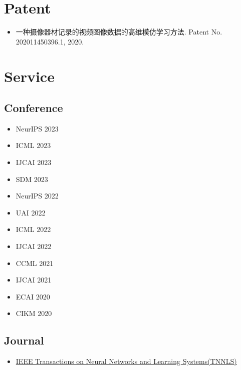 \documentclass[UTF8]{ctexart}
\begin{document}
\section*{Patent}
\begin{itemize}
    \item 一种摄像器材记录的视频图像数据的高维模仿学习方法. Patent No. 202011450396.1, 2020.
\end{itemize}

\section*{Service}
\subsection*{Conference}
\begin{itemize}
    \item NeurIPS 2023
    \item ICML 2023
    \item IJCAI 2023
    \item SDM 2023
    \item NeurIPS 2022
    \item UAI 2022
    \item ICML 2022
    \item IJCAI 2022
    \item CCML 2021
    \item IJCAI 2021
    \item ECAI 2020
    \item CIKM 2020
\end{itemize}
\subsection*{Journal}
\begin{itemize}
    \item \href{https://ieeexplore.ieee.org/xpl/RecentIssue.jsp?punumber=5962385}{IEEE Transactions on Neural Networks and Learning Systems(TNNLS)}
\end{itemize}
\end{document}
